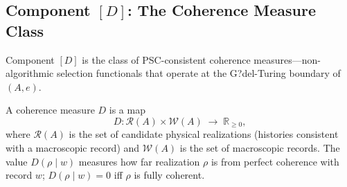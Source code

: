 \documentclass[12pt,letterpaper]{article}
\newcommand{\Dclass}{[D]}
\begin{document}
\subsection{Component \texorpdfstring{$[D]$}{[D]}: The Coherence Measure Class}
\label{sec:coherence}

Component $\Dclass$ is the class of PSC-consistent coherence measures---non-algorithmic
selection functionals that operate at the G?del-Turing boundary of $(A, e)$.

A coherence measure $D$ is a map
\begin{equation}
  D : \mathcal{R}(A) \times \mathcal{W}(A) \;\longrightarrow\; \mathbb{R}_{\geq 0},
  \label{eq:D-map}
\end{equation}
where $\mathcal{R}(A)$ is the set of candidate physical realizations (histories
consistent with a macroscopic record) and $\mathcal{W}(A)$ is the set of macroscopic
records.  The value $D(\rho \mid w)$ measures how far realization $\rho$ is from
perfect coherence with record $w$; $D(\rho \mid w) = 0$ iff $\rho$ is fully coherent.
\end{document}
